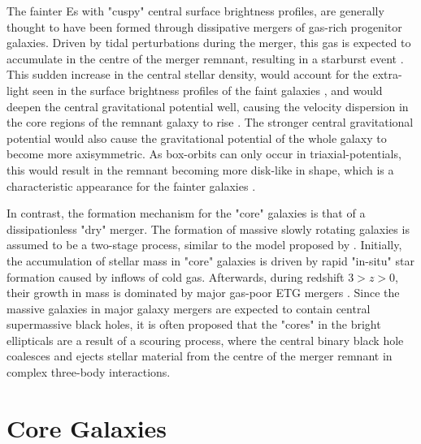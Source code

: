 \documentclass[english, twoside]{HYgradu}
\begin{document}
The fainter Es with "cuspy" central surface brightness profiles, are generally thought to have been formed through dissipative mergers of gas-rich progenitor galaxies. Driven by tidal perturbations during the merger, this gas is expected to accumulate in the centre of the merger remnant, resulting in a starburst event \citep{Barnes1991}. This sudden increase in the central stellar density, would account for the extra-light seen in the surface brightness profiles of the faint galaxies \citep{Hopkins2008}, and would deepen the central gravitational potential well, causing the velocity dispersion in the core regions of the remnant galaxy to rise \citep{Barnes1996}. The stronger central gravitational potential would also cause the gravitational potential of the whole galaxy to become more axisymmetric. As box-orbits can only occur in triaxial-potentials, this would result in the remnant becoming more disk-like in shape, which is a characteristic appearance for the fainter galaxies \citep{Naab2006}.

In contrast, the formation mechanism for the "core" galaxies is that of a dissipationless "dry" merger. The formation of massive slowly rotating galaxies is assumed to be a two-stage process, similar to the model proposed by \cite{Oser2010}. Initially, the accumulation of stellar mass in "core" galaxies is driven by rapid "in-situ" star formation caused by inflows of cold gas. Afterwards, during redshift $3 > z > 0$, their growth in mass is dominated by major gas-poor ETG mergers \citep{Naab2009}. Since the massive galaxies in major galaxy mergers are expected to contain central supermassive black holes, it is often proposed that the "cores" in the bright ellipticals are a result of a scouring process, where the central binary black hole coalesces and ejects stellar material from the centre of the merger remnant in complex three-body interactions.

\section{Core Galaxies} \label{section:core_galaxies}
\end{document}
